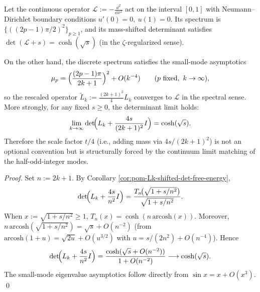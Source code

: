 \begin{corollary}\label{cor:pom-Lk-continuum-ND-det-cosh}
Let the continuous operator \(\mathcal L:=-\frac{\dd^2}{\dd x^2}\) act on the interval \([0,1]\) with Neumann--Dirichlet boundary conditions \(u'(0)=0,\ u(1)=0\).
Its spectrum is \(\{((2p-1)\pi/2)^2\}_{p\ge 1}\), and its mass-shifted determinant satisfies
\(
\det(\mathcal L+s)=\cosh(\sqrt{s})
\) (in the \(\zeta\)-regularized sense).
\par
On the other hand, the discrete spectrum satisfies the small-mode asymptotics
\[
\mu_p=\Bigl(\frac{(2p-1)\pi}{2k+1}\Bigr)^2+O(k^{-4})\qquad(p\ \text{fixed},\ k\to\infty),
\]
so the rescaled operator \(\widetilde L_k:=\frac{(2k+1)^2}{4}L_k\) converges to \(\mathcal L\) in the spectral sense.
More strongly, for any fixed \(s\ge 0\), the determinant limit holds:
\[
\lim_{k\to\infty}\det\!\Bigl(L_k+\frac{4s}{(2k+1)^2}I\Bigr)=\cosh(\sqrt{s}).
\]
Therefore the scale factor \(t/4\) (i.e., adding mass via \(4s/(2k+1)^2\)) is not an optional convention but is structurally forced by the continuum limit matching of the half-odd-integer modes.
\end{corollary}
\begin{proof}
Set \(n:=2k+1\). By Corollary \ref{cor:pom-Lk-shifted-det-free-energy},
\[
\det\!\Bigl(L_k+\frac{4s}{n^2}I\Bigr)
=\frac{T_{n}\!\bigl(\sqrt{1+s/n^2}\bigr)}{\sqrt{1+s/n^2}}.
\]
When \(x:=\sqrt{1+s/n^2}\ge 1\), \(T_n(x)=\cosh(n\,\mathrm{arcosh}(x))\).
Moreover, \(n\,\mathrm{arcosh}(\sqrt{1+s/n^2})=\sqrt{s}+O(n^{-2})\) (from \(\mathrm{arcosh}(1+u)=\sqrt{2u}+O(u^{3/2})\) with \(u=s/(2n^2)+O(n^{-4})\)).
Hence
\[
\det\!\Bigl(L_k+\frac{4s}{n^2}I\Bigr)
=\frac{\cosh(\sqrt{s}+O(n^{-2}))}{1+O(n^{-2})}
\longrightarrow \cosh(\sqrt{s}).
\]
The small-mode eigenvalue asymptotics follow directly from \(\sin x=x+O(x^3)\). \qed
\end{proof}

